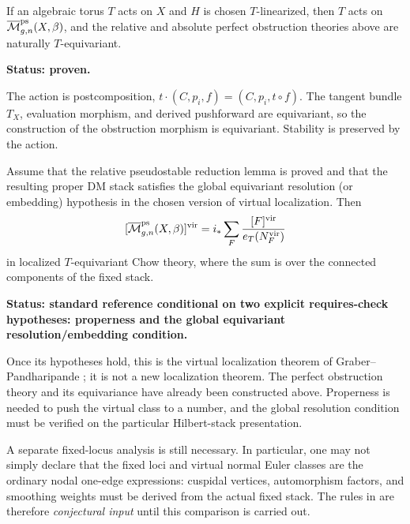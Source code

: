 \documentclass[12pt]{memoir}
\begin{document}
\begin{Prop}[Equivariance]
    \label{prop-ps-map-equivariance}
    If an algebraic torus \(T\) acts on \(X\) and \(H\) is chosen
    \(T\)-linearized, then \(T\) acts on
    \(\overline{\mathcal{M}}^{\operatorname{\mathrm{ps}}}_{g,n}(X,\beta)\), and the relative and absolute perfect
    obstruction theories above are naturally \(T\)-equivariant.

    \noindent\textbf{Status: proven.}
\end{Prop}

\begin{ptcbp}
    The action is postcomposition, \(t\cdot(C,p_i,f)=(C,p_i,t\circ f)\).
    The tangent bundle \(T_X\), evaluation morphism, and derived pushforward
    are equivariant, so the construction of the obstruction morphism is
    equivariant.  Stability is preserved by the action.
\end{ptcbp}

\begin{Th}
    \label{thm-conditional-ps-virtual-localization}
    Assume that the relative pseudostable reduction lemma is proved and that
    the resulting proper DM stack satisfies the global equivariant resolution
    (or embedding) hypothesis in the chosen version of virtual localization.
    Then
    \[
        [\overline{\mathcal{M}}^{\operatorname{\mathrm{ps}}}_{g,n}(X,\beta)]^{\mathrm{vir}}
        =i_*\sum_F
        \frac{[F]^{\mathrm{vir}}}{e_T(N_F^{\mathrm{vir}})}
    \]
    in localized \(T\)-equivariant Chow theory, where the sum is over the
    connected components of the fixed stack.

    \noindent\textbf{Status: standard reference conditional on two explicit
    requires-check hypotheses: properness and the global equivariant
    resolution/embedding condition.}
\end{Th}

\begin{ptcbp}
    Once its hypotheses hold, this is the virtual localization theorem of
    Graber--Pandharipande \cite{GraberPandharipandeVirtualLocalization}; it is
    not a new localization theorem.  The perfect obstruction theory and its
    equivariance have already been constructed above.  Properness is needed
    to push the virtual class to a number, and the global resolution condition
    must be verified on the particular Hilbert-stack presentation.

    A separate fixed-locus analysis is still necessary.  In particular, one
    may not simply declare that the fixed loci and virtual normal Euler
    classes are the ordinary nodal one-edge expressions: cuspidal vertices,
    automorphism factors, and smoothing weights must be derived from the
    actual fixed stack.  The rules in \cite{DustyNotes} are therefore
    \emph{conjectural input} until this comparison is carried out.
\end{ptcbp}
\end{document}
